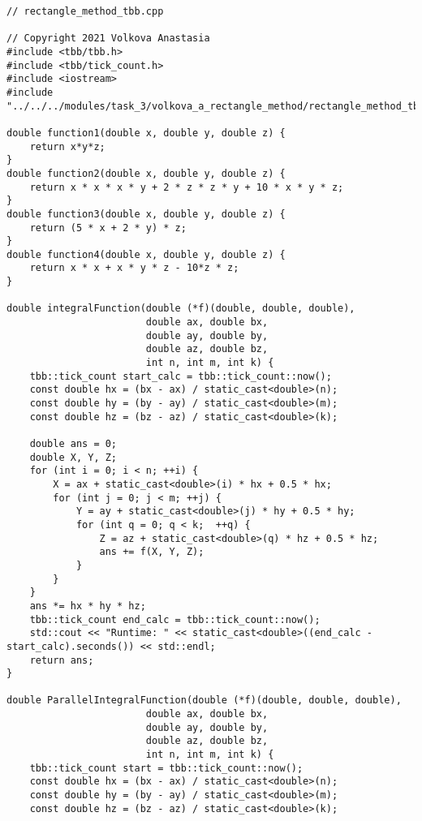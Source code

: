 \documentclass{report}
\begin{document}
\begin{lstlisting}
// rectangle_method_tbb.cpp

// Copyright 2021 Volkova Anastasia
#include <tbb/tbb.h>
#include <tbb/tick_count.h>
#include <iostream>
#include "../../../modules/task_3/volkova_a_rectangle_method/rectangle_method_tbb.h"

double function1(double x, double y, double z) {
    return x*y*z;
}
double function2(double x, double y, double z) {
    return x * x * x * y + 2 * z * z * y + 10 * x * y * z;
}
double function3(double x, double y, double z) {
    return (5 * x + 2 * y) * z;
}
double function4(double x, double y, double z) {
    return x * x + x * y * z - 10*z * z;
}

double integralFunction(double (*f)(double, double, double),
                        double ax, double bx,
                        double ay, double by,
                        double az, double bz,
                        int n, int m, int k) {
    tbb::tick_count start_calc = tbb::tick_count::now();
    const double hx = (bx - ax) / static_cast<double>(n);
    const double hy = (by - ay) / static_cast<double>(m);
    const double hz = (bz - az) / static_cast<double>(k);

    double ans = 0;
    double X, Y, Z;
    for (int i = 0; i < n; ++i) {
        X = ax + static_cast<double>(i) * hx + 0.5 * hx;
        for (int j = 0; j < m; ++j) {
            Y = ay + static_cast<double>(j) * hy + 0.5 * hy;
            for (int q = 0; q < k;  ++q) {
                Z = az + static_cast<double>(q) * hz + 0.5 * hz;
                ans += f(X, Y, Z);
            }
        }
    }
    ans *= hx * hy * hz;
    tbb::tick_count end_calc = tbb::tick_count::now();
    std::cout << "Runtime: " << static_cast<double>((end_calc - start_calc).seconds()) << std::endl;
    return ans;
}

double ParallelIntegralFunction(double (*f)(double, double, double),
                        double ax, double bx,
                        double ay, double by,
                        double az, double bz,
                        int n, int m, int k) {
    tbb::tick_count start = tbb::tick_count::now();
    const double hx = (bx - ax) / static_cast<double>(n);
    const double hy = (by - ay) / static_cast<double>(m);
    const double hz = (bz - az) / static_cast<double>(k);


\end{lstlisting}
\end{document}
